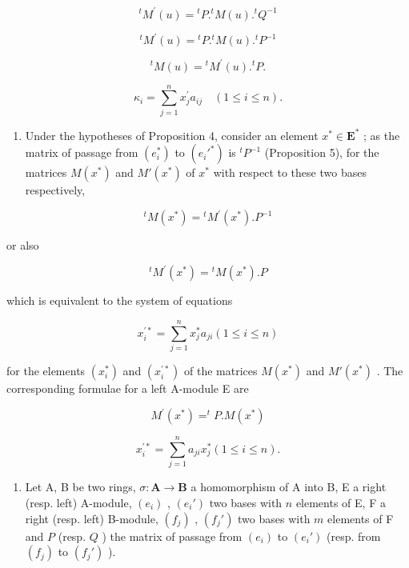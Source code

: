 \[
{ } ^ { t } M ^ { \prime } ( u ) = { } ^ { t } P . { } ^ { t } M ( u ) . { } ^ { t } Q ^ { - 1 }\tag{33 G}
\]

\[
{ } ^ { t } M ^ { \prime } ( u ) = { } ^ { t } P . { } ^ { t } M ( u ) . { } ^ { t } P ^ { - 1 }\tag{34 G}
\]

\[
{ } ^ { t } M ( u ) = { } ^ { t } M ^ { \prime } ( u ) . { } ^ { t } P .\tag{35 G}
\]

\[
\kappa_ {i} = \sum_ {j = 1} ^ {n} x _ {j} ^ {\prime} a _ {i j} \quad (1 \leqslant i \leqslant n).\tag{36 G}
\]

\begin{enumerate}
\def\labelenumi{(\arabic{enumi})}
\setcounter{enumi}{1}
\tightlist
\item
  Under the hypotheses of Proposition 4, consider an element \(x^{*} \in \mathbf{E}^{*}\) ; as the matrix of passage from \((e_i^*)\) to \((e_i'^*)\) is \(^tP^{-1}\) (Proposition 5), for the matrices \(M(x^{*})\) and \(M'(x^{*})\) of \(x^{*}\) with respect to these two bases respectively,
\end{enumerate}

\[
{ } ^ { t } M ( x ^ { * } ) = { } ^ { t } M ^ { \prime } ( x ^ { * } ) . P ^ { - 1 }
\]

or also

\[
{ } ^ { t } M ^ { \prime } ( x ^ { * } ) = { } ^ { t } M ( x ^ { * } ) . P\tag{37 D}
\]

which is equivalent to the system of equations

\[
x _ {i} ^ {\prime *} = \sum_ {j = 1} ^ {n} x _ {j} ^ {*} a _ {j i} (1 \leqslant i \leqslant n)\tag{38 D}
\]

for the elements \((x_{i}^{*})\) and \((x_{i}^{\prime *})\) of the matrices \(M(x^{*})\) and \(M'(x^{*})\) . The corresponding formulae for a left A-module E are

\[
M ^ {\prime} (x ^ {*}) = ^ {t} P. M (x ^ {*})\tag{37 G}
\]

\[
x _ {i} ^ {\prime *} = \sum_ {j = 1} ^ {n} a _ {j i} x _ {j} ^ {*} (1 \leqslant i \leqslant n).\tag{38 G}
\]

\begin{enumerate}
\def\labelenumi{(\arabic{enumi})}
\setcounter{enumi}{2}
\tightlist
\item
  Let A, B be two rings, \(\sigma: \mathbf{A} \to \mathbf{B}\) a homomorphism of A into B, E a right (resp. left) A-module, \((e_i)\) , \((e_i')\) two bases with \(n\) elements of E, F a right (resp. left) B-module, \((f_j)\) , \((f_j')\) two bases with \(m\) elements of F and \(P\) (resp. \(Q\) ) the matrix of passage from \((e_i)\) to \((e_i')\) (resp. from \((f_j)\) to \((f_j')\) ).
\end{enumerate}

